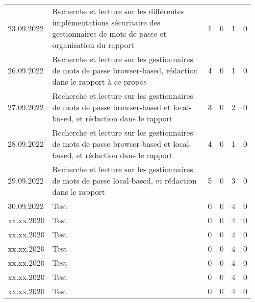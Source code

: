 \begin{landscape}
\begin{longtable}[c]{lp{10cm}rrrr}
	23.09.2022 
	& Recherche et lecture sur les différentes implémentations sécuritaire des gestionnaires de mots de passe et organisation du rapport
	& 1 %
	& 0 %
	& 1 %
	& 0\\ %

	26.09.2022  
	& Recherche et lecture sur les gestionnaires de mots de passe browser-based, rédaction dans le rapport à ce propos
	& 4 %
	& 0 %
	& 1 %
	& 0\\ %
	
	
	27.09.2022  
	& Recherche et lecture sur les gestionnaires de mots de passe browser-based et local-based, et rédaction dans le rapport
	& 3 %
	& 0 %
	& 2 %
	& 0\\ %
	
	28.09.2022  
	& Recherche et lecture sur les gestionnaires de mots de passe browser-based et local-based, et rédaction dans le rapport
	& 4 %
	& 0 %
	& 1 %
	& 0\\ %

	29.09.2022  
	& Recherche et lecture sur les gestionnaires de mots de passe local-based, et rédaction dans le rapport
	& 5 %
	& 0 %
	& 3 %
	& 0\\ %

	30.09.2022 
	& Test
	& 0 %
	& 0 %
	& 4 %
	& 0\\ %

	xx.xx.2020 
	& Test
	& 0 %
	& 0 %
	& 4 %
	& 0\\ %

	xx.xx.2020 
	& Test
	& 0 %
	& 0 %
	& 4 %
	& 0\\ %
	
	xx.xx.2020 
	& Test
	& 0 %
	& 0 %
	& 4 %
	& 0\\ %

	xx.xx.2020 
	& Test
	& 0 %
	& 0 %
	& 4 %
	& 0\\ %

	xx.xx.2020 
	& Test
	& 0 %
	& 0 %
	& 4 %
	& 0\\ %

	xx.xx.2020 
	& Test
	& 0 %
	& 0 %
	& 4 %
	& 0\\ %
	
\end{longtable}


\end{landscape}
